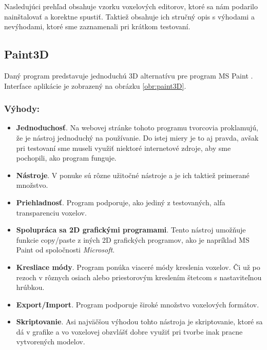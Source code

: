 Nasledujúci prehľad obsahuje vzorku voxelových editorov, ktoré sa nám podarilo nainštalovať a korektne spustiť. Taktiež obsahuje ich stručný opis s výhodami a nevýhodami, ktoré sme zaznamenali pri krátkom testovaní.
\subsection{Paint3D}
Daný program predstavuje jednoduchú 3D alternatívu pre program MS Paint \cite{paint3d}. Interface aplikácie je zobrazený na obrázku \ref{obr:paint3D}.
\subsubsection{Výhody:}
\begin{itemize}
	\item \textbf{Jednoduchosť}. Na webovej stránke tohoto programu tvorcovia proklamujú, že je nástroj jednoduchý na používanie. Do istej miery je to aj pravda, avšak pri testovaní sme museli využiť niektoré internetové zdroje, aby sme pochopili, ako program funguje. 
	\item \textbf{Nástroje}. V ponuke sú rôzne užitočné nástroje a je ich taktiež primerané množstvo.
	\item \textbf{Priehladnosť}. Program podporuje, ako jediný z testovaných, alfa transparenciu voxelov.
	\item \textbf{Spolupráca sa 2D grafickými programami}. Tento nástroj umožňuje funkcie copy/paste z iných 2D grafických programov, ako je napríklad MS Paint od spoločnosti \textit{Microsoft}.
	\item \textbf{Kresliace módy}. Program ponúka viaceré módy kreslenia voxelov. Či už po rezoch v rôznych osiach alebo priestorovým kreslením štetcom s nastaviteľnou hrúbkou.
	\item \textbf{Export/Import}. Program podporuje široké množstvo voxelových formátov.
	\item \textbf{Skriptovanie}. Asi najväčšou výhodou tohto nástroja je skriptovanie, ktoré sa dá v grafike a vo voxelovej obzvlášť dobre využiť pri tvorbe inak pracne vytvorených modelov.  
\end{itemize}

